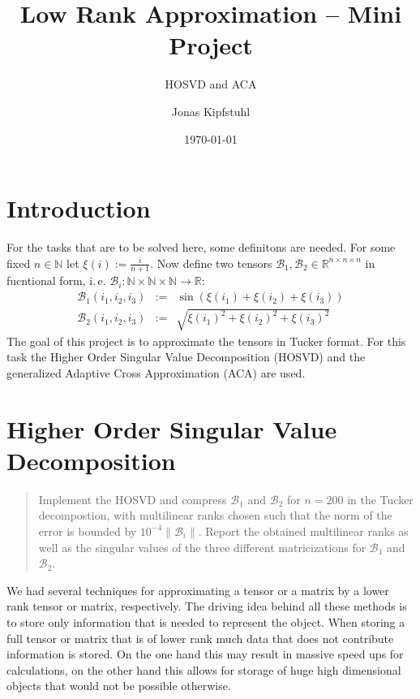 \documentclass[%
a4paper,
parskip=half,
DIV=calc,
]
{scrartcl}
\title{Low Rank Approximation -- Mini Project}
\subtitle{HOSVD and ACA}
\author{Jonas Kipfstuhl}
\date{\today}
\begin{document}
\maketitle

\section*{Introduction}
\label{sec:intro}
For the tasks that are to be solved here, some definitons are
needed. For some fixed $n \in \mathbb{N}$ let
$\xi(i) := \frac{i}{n+1}$. Now define two tensors
$\mathcal{B}_1, \mathcal{B}_2 \in \mathbb{R}^{n \times n \times n}$ in
fucntional form, i.\,e.
$\mathcal{B}_i: \mathbb{N} \times \mathbb{N} \times \mathbb{N}
\rightarrow \mathbb{R}$:
\begin{align*}
  \mathcal{B}_1 \left(i_1, i_2, i_3 \right) &:=& \sin\left(\xi(i_1) + \xi(i_2) + \xi(i_3)\right) \\
  \mathcal{B}_2 \left(i_1, i_2, i_3 \right) &:=& \sqrt{\xi(i_1)^2 + \xi(i_2)^2 + \xi(i_3)^2}
\end{align*}
The goal of this project is to approximate the tensors in Tucker
format.  For this task the Higher Order Singular Value Decomposition
(HOSVD) and the generalized Adaptive Cross Approximation (ACA) are
used.


\section{Higher Order Singular Value Decomposition}
\label{sec:ex1}
\begin{quote}
  Implement the HOSVD and compress $\mathcal{B}_1$ and
  $\mathcal{B }_2$ for $n = 200$ in the Tucker decompostion, with
  multilinear ranks chosen such that the norm of the error is bounded
  by $10^{−4} \|\mathcal{B}_i\|$.  Report the obtained multilinear
  ranks as well as the singular values of the three different
  matricizations for $\mathcal{B}_1$ and $\mathcal{B}_2$.
\end{quote}

We had several techniques for approximating a tensor or a matrix by a
lower rank tensor or matrix, respectively.  The driving idea behind
all these methods is to store only information that is needed to
represent the object.  When storing a full tensor or matrix that is of
lower rank much data that does not contribute information is stored.
On the one hand this may result in massive speed ups for calculations,
on the other hand this allows for storage of huge high dimensional
objects that would not be possible otherwise.
\end{document}
